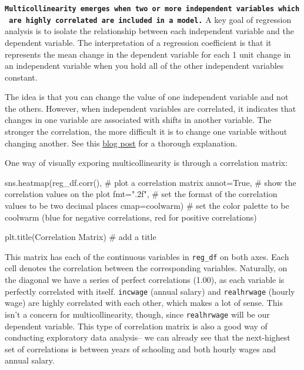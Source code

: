 \documentclass[
  letterpaper,
  DIV=11,
  numbers=noendperiod]{scrreprt}
\newenvironment{Shaded}{\begin{snugshade}}{\end{snugshade}}
\newcommand{\CommentTok}[1]{\textcolor[rgb]{0.37,0.37,0.37}{#1}}
\newcommand{\NormalTok}[1]{\textcolor[rgb]{0.00,0.23,0.31}{#1}}
\newcommand{\OperatorTok}[1]{\textcolor[rgb]{0.37,0.37,0.37}{#1}}
\newcommand{\StringTok}[1]{\textcolor[rgb]{0.13,0.47,0.30}{#1}}
\newcommand{\VariableTok}[1]{\textcolor[rgb]{0.07,0.07,0.07}{#1}}
\begin{document}
\textbf{\texttt{Multicollinearity\ emerges\ when\ two\ or\ more\ independent\ variables\ which\ are\ highly\ correlated\ are\ included\ in\ a\ model.}}
A key goal of regression analysis is to isolate the relationship between
each independent variable and the dependent variable. The interpretation
of a regression coefficient is that it represents the mean change in the
dependent variable for each 1 unit change in an independent variable
when you hold all of the other independent variables constant.

The idea is that you can change the value of one independent variable
and not the others. However, when independent variables are correlated,
it indicates that changes in one variable are associated with shifts in
another variable. The stronger the correlation, the more difficult it is
to change one variable without changing another. See this
\href{https://statisticsbyjim.com/regression/multicollinearity-in-regression-analysis/}{blog
post} for a thorough explanation.

One way of visually exporing multicollinearity is through a correlation
matrix:

\begin{Shaded}
\begin{Highlighting}[]
\NormalTok{sns.heatmap(reg\_df.corr(), }\CommentTok{\# plot a correlation matrix }
\NormalTok{            annot}\OperatorTok{=}\VariableTok{True}\NormalTok{, }\CommentTok{\# show the correlation values on the plot}
\NormalTok{            fmt}\OperatorTok{=}\StringTok{".2f"}\NormalTok{, }\CommentTok{\# set the format of the correlation values to be two decimal places}
\NormalTok{            cmap}\OperatorTok{=}\StringTok{\textquotesingle{}coolwarm\textquotesingle{}}\NormalTok{) }\CommentTok{\# set the color palette to be coolwarm (blue for negative correlations, red for positive correlations)}

\NormalTok{plt.title(}\StringTok{\textquotesingle{}Correlation Matrix\textquotesingle{}}\NormalTok{) }\CommentTok{\# add a title}
\end{Highlighting}
\end{Shaded}

This matrix has each of the continuous variables in \texttt{reg\_df} on
both axes. Each cell denotes the correlation between the corresponding
variables. Naturally, on the diagonal we have a series of perfect
correlations (1.00), as each variable is perfectly correlated with
itself. \texttt{incwage} (annual salary) and \texttt{realhrwage} (hourly
wage) are highly correlated with each other, which makes a lot of sense.
This isn't a concern for multicollinearity, though, since
\texttt{realhrwage} will be our dependent variable. This type of
correlation matrix is also a good way of conducting exploratory data
analysis-- we can already see that the next-highest set of correlations
is between years of schooling and both hourly wages and annual salary.
\end{document}
